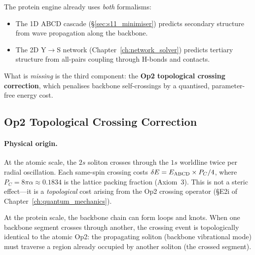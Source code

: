The protein engine already uses \emph{both} formalisms:
\begin{itemize}
    \item The 1D ABCD cascade (\S\ref{sec:s11_minimiser})
          predicts secondary structure from wave propagation
          along the backbone.
    \item The 2D Y$\to$S network
          (Chapter~\ref{ch:network_solver}) predicts
          tertiary structure from all-pairs coupling through
          H-bonds and contacts.
\end{itemize}
What is \emph{missing} is the third component: the
\textbf{Op2 topological crossing correction}, which
penalises backbone self-crossings by a quantised,
parameter-free energy cost.

\subsection{Op2 Topological Crossing Correction}
\label{sec:op2_crossing}

\paragraph{Physical origin.}
At the atomic scale, the $2s$ soliton crosses through the
$1s$ worldline twice per radial oscillation.
Each same-spin crossing costs
$\delta E = E_{\rm ABCD} \times P_C/4$, where
$P_C = 8\pi\alpha \approx 0.1834$ is the lattice packing
fraction (Axiom~3).  This is not a steric effect---it is a
\emph{topological} cost arising from the Op2 crossing
operator (\S E2i of Chapter~\ref{ch:quantum_mechanics}).

At the protein scale, the backbone chain can form loops and
knots.  When one backbone segment crosses through another,
the crossing event is topologically identical to the
atomic Op2: the propagating soliton (backbone vibrational
mode) must traverse a region already occupied by another
soliton (the crossed segment).

